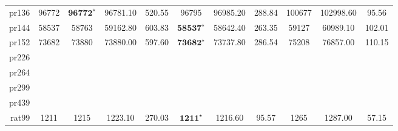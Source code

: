\documentclass[12pt]{ctexart}
\begin{document}
\begin{table}[htbp]
\begin{tabular}{rcccccccccc}
        pr136                         & 96772                             & $\textbf{96772}^\star$      & 96781.10                               & 520.55           & 96795                   & 96985.20         & 288.84           & 100677                & 102998.60        & 95.56            \\
        pr144                         & 58537                             & 58763                       & 59162.80                               & 603.83           & $\textbf{58537}^\star$  & 58642.40         & 263.35           & 59127                 & 60989.10         & 102.01           \\
        pr152                         & 73682                             & 73880                       & 73880.00                               & 597.60           & $\textbf{73682}^\star$  & 73737.80         & 286.54           & 75208                 & 76857.00         & 110.15           \\
        pr226                                                                                                                                                                                                                                                                                     \\
        pr264                                                                                                                                                                                                                                                                                     \\
        pr299                                                                                                                                                                                                                                                                                     \\
        pr439                                                                                                                                                                                                                                                                                     \\
        rat99                         & 1211                              & 1215                        & 1223.10                                & 270.03           & $\textbf{1211}^\star$   & 1216.60          & 95.57            & 1265                  & 1287.00          & 57.15            \\

\end{tabular}
\end{table}
\end{document}
